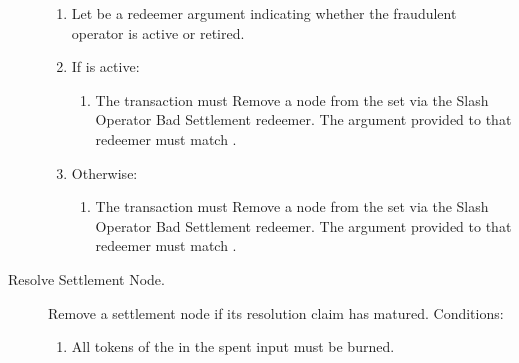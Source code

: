 \documentclass[../midgard.tex]{subfiles}
\begin{document}
\begin{description}
\begin{enumerate}
        \item Let  be a redeemer argument indicating whether the fraudulent operator is active or retired.
        \item If  is active:
            \begin{enumerate}
                \item The transaction must Remove a node from the  set via the Slash Operator Bad Settlement redeemer.
                  The  argument provided to that redeemer must match .
            \end{enumerate}
        \item Otherwise:
            \begin{enumerate}
                \item The transaction must Remove a node from the  set via the Slash Operator Bad Settlement redeemer.
                  The  argument provided to that redeemer must match .
            \end{enumerate}
      \end{enumerate}
  \item[Resolve Settlement Node.] Remove a settlement node if its resolution claim has matured.
    Conditions:
      \begin{enumerate}
          \item All tokens of the  in the spent input must be burned.
      \end{enumerate}
\end{description}
\end{document}
